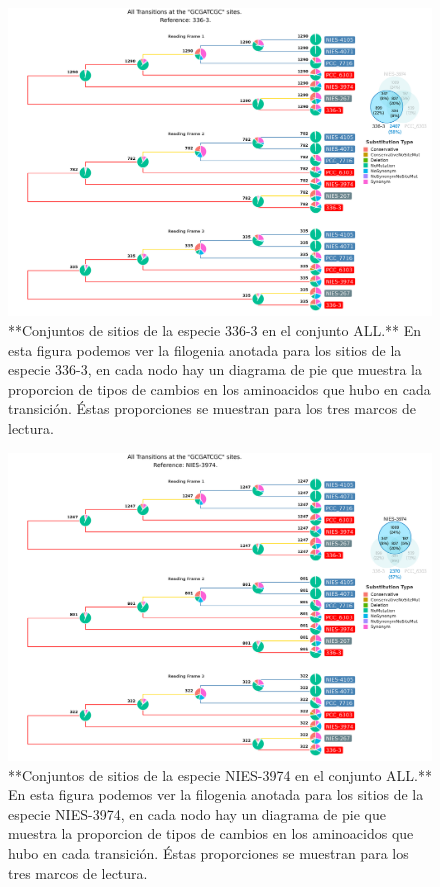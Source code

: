 \documentclass[
]{book}
\begin{document}
\begin{figure}

{\centering \includegraphics[width=1.2\linewidth]{Clados/Calothrix_B/figures/A/GCGATCGC/All/336-3_All_A_tree} 

}

\caption{**Conjuntos de sitios de la especie 336-3 en el conjunto ALL.** En esta figura podemos ver la filogenia anotada para los sitios de la especie 336-3, en cada nodo hay un diagrama de pie que muestra la proporcion de tipos de cambios en los aminoacidos que hubo en cada transición. Éstas proporciones se muestran para los tres marcos de lectura.}\label{fig:FIG13x}
\end{figure}

\begin{figure}

{\centering \includegraphics[width=1.2\linewidth]{Clados/Calothrix_B/figures/A/GCGATCGC/All/NIES-3974_All_A_tree} 

}

\caption{**Conjuntos de sitios de la especie NIES-3974 en el conjunto ALL.** En esta figura podemos ver la filogenia anotada para los sitios de la especie NIES-3974, en cada nodo hay un diagrama de pie que muestra la proporcion de tipos de cambios en los aminoacidos que hubo en cada transición. Éstas proporciones se muestran para los tres marcos de lectura.}\label{fig:FIG14x}
\end{figure}
\end{document}
